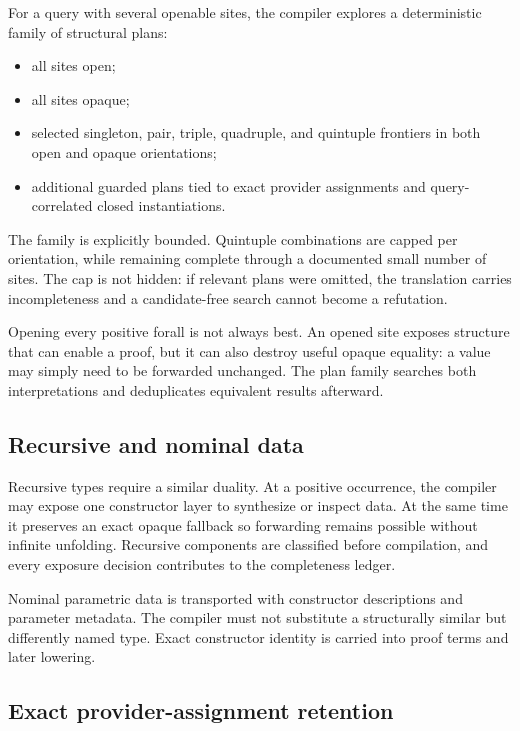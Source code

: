 \documentclass[10pt,letterpaper,oneside]{report}
\begin{document}
For a query with several openable sites, the compiler explores a deterministic family of structural plans:

\begin{itemize}
  \item all sites open;
  \item all sites opaque;
  \item selected singleton, pair, triple, quadruple, and quintuple frontiers in both open and opaque orientations;
  \item additional guarded plans tied to exact provider assignments and query-correlated closed instantiations.
\end{itemize}

The family is explicitly bounded. Quintuple combinations are capped per orientation, while remaining complete through a documented small number of sites. The cap is not hidden: if relevant plans were omitted, the translation carries incompleteness and a candidate-free search cannot become a refutation.

\begin{designbox}
Opening every positive forall is not always best. An opened site exposes structure that can enable a proof, but it can also destroy useful opaque equality: a value may simply need to be forwarded unchanged. The plan family searches both interpretations and deduplicates equivalent results afterward.
\end{designbox}

\subsection{Recursive and nominal data}

Recursive types require a similar duality. At a positive occurrence, the compiler may expose one constructor layer to synthesize or inspect data. At the same time it preserves an exact opaque fallback so forwarding remains possible without infinite unfolding. Recursive components are classified before compilation, and every exposure decision contributes to the completeness ledger.

Nominal parametric data is transported with constructor descriptions and parameter metadata. The compiler must not substitute a structurally similar but differently named type. Exact constructor identity is carried into proof terms and later lowering.

\subsection{Exact provider-assignment retention}
\end{document}
